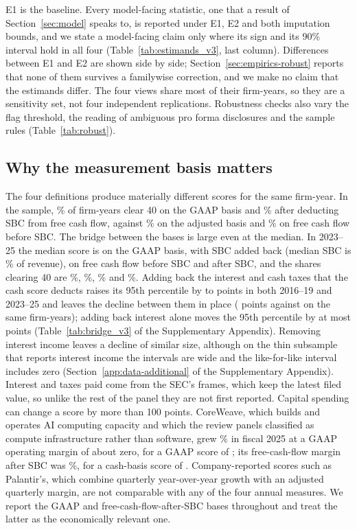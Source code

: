 E1 is the baseline. Every model-facing statistic, one that a result of Section~\ref{sec:model} speaks to, is reported under E1, E2 and both imputation bounds, and we state a model-facing claim only where its sign and its 90\% interval hold in all four (Table~\ref{tab:estimands_v3}, last column). Differences between E1 and E2 are shown side by side; Section~\ref{sec:empirics-robust} reports that none of them survives a familywise correction, and we make no claim that the estimands differ. The four views share most of their firm-years, so they are a sensitivity set, not four independent replications. Robustness checks also vary the flag threshold, the reading of ambiguous pro forma disclosures and the sample rules (Table~\ref{tab:robust}).

\subsection{Why the measurement basis matters}
The four definitions produce materially different scores for the same firm-year. In the sample, \VPassOp\% of firm-years clear 40 on the GAAP basis and \VPassCash\% after deducting SBC from free cash flow, against \VPassAdj\% on the adjusted basis and \VPassFcf\% on free cash flow before SBC. The bridge between the bases is large even at the median. In 2023--25 the median score is \VBridgeMedOp{} on the GAAP basis, \VBridgeMedAdj{} with SBC added back (median SBC is \VBridgeSbc\% of revenue), \VBridgeMedFcf{} on free cash flow before SBC and \VBridgeMedCash{} after SBC, and the shares clearing 40 are \VBridgePassOp\%, \VBridgePassAdj\%, \VBridgePassFcf\% and \VBridgePassCash\%. Adding back the interest and cash taxes that the cash score deducts raises its 95th percentile by \BridgeLiftLo{} to \BridgeLiftHi{} points in both 2016--19 and 2023--25 and leaves the decline between them in place (\BridgeChangePre{} points against \BridgeChangeBs{} on the same firm-years); adding back interest alone moves the 95th percentile by at most \BridgeIntMax{} points (Table~\ref{tab:bridge_v3} of the Supplementary Appendix). Removing interest income leaves a decline of similar size, although on the thin subsample that reports interest income the intervals are wide and the like-for-like interval includes zero (Section~\ref{app:data-additional} of the Supplementary Appendix). Interest and taxes paid come from the SEC's frames, which keep the latest filed value, so unlike the rest of the panel they are not first reported. Capital spending can change a score by more than 100 points. CoreWeave, which builds and operates AI computing capacity and which the review panels classified as compute infrastructure rather than software, grew \VCwGrowth\% in fiscal 2025 at a GAAP operating margin of about zero, for a GAAP score of \VCwOp; its free-cash-flow margin after SBC was \VCwFcfMargin\%, for a cash-basis score of \VCwCash. Company-reported scores such as Palantir's, which combine quarterly year-over-year growth with an adjusted quarterly margin, are not comparable with any of the four annual measures. We report the GAAP and free-cash-flow-after-SBC bases throughout and treat the latter as the economically relevant one.
